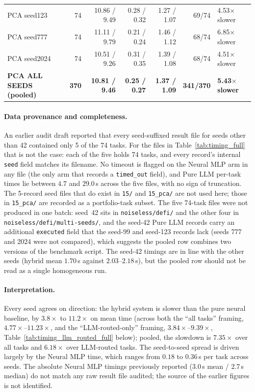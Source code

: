\documentclass[twoside,11pt]{article}
\begin{document}
\begin{table}[htbp]
\begin{tabular}{lrrrrrl}
PCA seed123 & 74 & 10.86 / 9.49 & 0.28 / 0.32 & 1.27 / 1.07 & 69/74 & 4.53$\times$ slower \\
PCA seed777 & 74 & 11.11 / 9.79 & 0.21 / 0.24 & 1.46 / 1.12 & 68/74 & 6.85$\times$ slower \\
PCA seed2024 & 74 & 10.51 / 9.26 & 0.31 / 0.35 & 1.39 / 1.08 & 68/74 & 4.51$\times$ slower \\
\rowcolor{black!8}
\textbf{PCA ALL SEEDS (pooled)} & \textbf{370} & \textbf{10.81 / 9.46} & \textbf{0.25 / 0.27} & \textbf{1.37 / 1.09} & \textbf{341/370} & \textbf{5.43$\times$ slower} \\
\bottomrule
\end{tabular}
\end{table}

\paragraph{Data provenance and completeness.}
\label{sec:timing_data_defect}
An earlier audit draft reported that every seed-suffixed result file for
seeds other than 42 contained only 5 of the 74 tasks. For the files in
Table~\ref{tab:timing_full} that is not the case: each of the five holds
74 tasks, and every record's internal \texttt{seed} field matches its filename. No timeout is flagged on the
Neural MLP arm in any file (the only arm that records a \texttt{timed\_out} field), and Pure LLM per-task
times lie between $4.7$ and $29.0$\,s across the five files, with no sign of truncation. The 5-record seed files that
do exist in \texttt{15/} and \texttt{15\_pca/} are not used here; those in
\texttt{15\_pca/} are recorded as a portfolio-task subset. The five 74-task files were not
produced in one batch: seed~42 sits in \texttt{noiseless/defi/} and the other
four in \texttt{noiseless/defi/multi-seeds/}, and the seed-42 Pure LLM records
carry an additional \texttt{executed} field that the seed-99 and seed-123 records lack
(seeds 777 and 2024 were not compared), which suggests the
pooled row combines two versions of the benchmark script. The seed-42 timings are in
line with the other seeds (hybrid mean $1.70$\,s against $2.03$--$2.18$\,s),
but the pooled row should not be read as a single homogeneous run.

\paragraph{Interpretation.}
Every seed agrees on direction: the hybrid system is
slower than the pure neural baseline, by $3.8\times$ to $11.2\times$ on
mean time (across both the ``all tasks'' framing, $4.77\times$--$11.23\times$,
and the ``LLM-routed-only'' framing, $3.84\times$--$9.39\times$,
Table~\ref{tab:timing_llm_routed_full} below); pooled, the slowdown is
$7.35\times$ over all tasks and $6.18\times$ over LLM-routed tasks. The seed-to-seed spread is driven
largely by the Neural MLP time, which ranges from $0.18$ to $0.36$\,s per task
across seeds. The absolute Neural MLP timings previously reported
(3.0\,s mean / 2.7\,s median) do not match any raw result file audited;
the source of the earlier figures is not identified.
\end{document}
